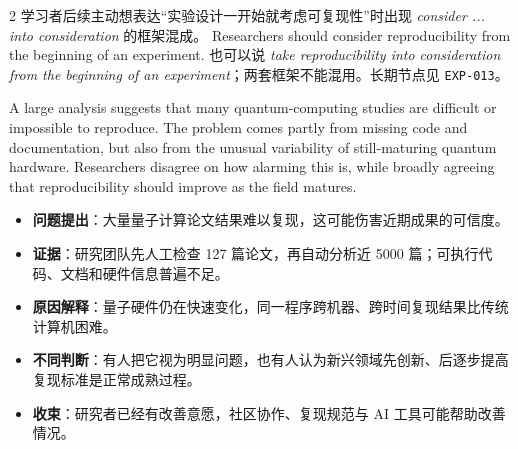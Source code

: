 \documentclass[11pt,a4paper]{ctexart}
\begin{document}
\begin{paracol}{2}
  {学习者后续主动想表达“实验设计一开始就考虑可复现性”时出现 \textit{consider ... into consideration} 的框架混成。}
  {Researchers should consider reproducibility from the beginning of an experiment.}
  {也可以说 \textit{take reproducibility into consideration from the beginning of an experiment}；两套框架不能混用。长期节点见 \texttt{EXP-013}。}

\end{paracol}


\begin{coretakeaway}[训练后主旨]
  A large analysis suggests that many quantum-computing studies are difficult or impossible to reproduce. The problem comes partly from missing code and documentation, but also from the unusual variability of still-maturing quantum hardware. Researchers disagree on how alarming this is, while broadly agreeing that reproducibility should improve as the field matures.
\end{coretakeaway}

\begin{itemize}
  \item \textbf{问题提出}：大量量子计算论文结果难以复现，这可能伤害近期成果的可信度。
  \item \textbf{证据}：研究团队先人工检查 127 篇论文，再自动分析近 5000 篇；可执行代码、文档和硬件信息普遍不足。
  \item \textbf{原因解释}：量子硬件仍在快速变化，同一程序跨机器、跨时间复现结果比传统计算机困难。
  \item \textbf{不同判断}：有人把它视为明显问题，也有人认为新兴领域先创新、后逐步提高复现标准是正常成熟过程。
  \item \textbf{收束}：研究者已经有改善意愿，社区协作、复现规范与 AI 工具可能帮助改善情况。
\end{itemize}

\end{document}

